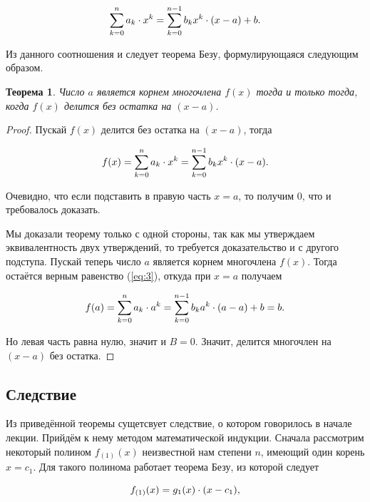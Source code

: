 \documentclass[12pt]{article}
\newtheorem{theorem}{Теорема}[section]
\begin{document}
\begin{equation}
\sum_{k=0}^n{a_k \cdot x^k} = \sum_{k=0}^{n-1}{b_k x^k}\cdot \qty(x-a) + b.
\label{eq:3}
\end{equation}

Из данного соотношения и следует теорема Безу, формулирующаяся следующим образом.

\begin{theorem}
	Число $a$ является корнем многочлена $f(x)$ тогда и только тогда, когда $f(x)$ делится без остатка на $(x-a)$.
\end{theorem}

\begin{proof}
Пускай $f(x)$ делится без остатка на $(x-a)$, тогда 

\begin{equation}
f(x) = \sum_{k=0}^n{a_k \cdot x^k} = \sum_{k=0}^{n-1}{b_k x^k}\cdot \qty(x-a).
\end{equation}

Очевидно, что если подставить в правую часть $x=a$, то получим $0$, что и требовалось доказать. 

\par 
Мы доказали теорему только с одной стороны, так как мы утверждаем эквивалентность двух утверждений, то требуется доказательство и с другого подступа. Пускай теперь число $a$ является корнем многочлена $f(x)$. Тогда остаётся верным равенство (\ref{eq:3}), откуда при $x=a$ получаем

\begin{equation}
  f(a) = \sum_{k=0}^n{a_k \cdot a^k} = \sum_{k=0}^{n-1}{b_k a^k}\cdot \qty(a-a) + b = b.
\end{equation}

Но левая часть равна нулю, значит и $B = 0$. Значит, делится многочлен на $(x-a)$ без остатка.
\end{proof}

\subsection{Следствие}
Из приведённой теоремы сущетсвует следствие, о котором говорилось в начале лекции. Прийдём к нему методом математической индукции. Сначала рассмотрим некоторый полином $f_{(1)}(x)$ неизвестной нам степени $n$, имеющий один корень $x=c_1$. Для такого полинома работает теорема Безу, из которой следует

\begin{equation}
  f_{(1)}(x) = g_1(x)\cdot \qty(x-c_1),
\end{equation}
\end{document}

